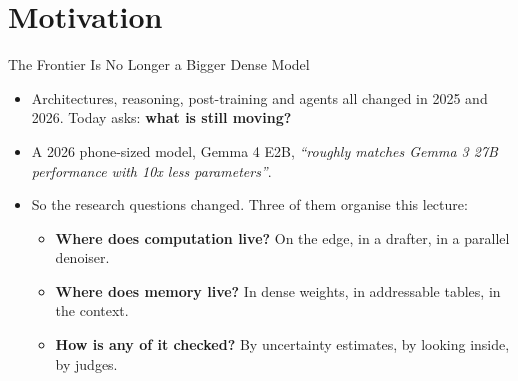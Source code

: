 \section{Motivation}

\begin{frame}{The Frontier Is No Longer a Bigger Dense Model}
    \begin{itemize}\itemsep0.55em
        \item Architectures, reasoning, post-training and agents all changed in 2025 and 2026. Today asks: \textbf{what is still moving?}
        \item A 2026 phone-sized model, Gemma 4 E2B, \emph{``roughly matches Gemma 3 27B performance with 10x less parameters''}.
        \item So the research questions changed. Three of them organise this lecture:
        \begin{itemize}\itemsep0.25em
            \item \textbf{Where does computation live?} On the edge, in a drafter, in a parallel denoiser.
            \item \textbf{Where does memory live?} In dense weights, in addressable tables, in the context.
            \item \textbf{How is any of it checked?} By uncertainty estimates, by looking inside, by judges.
        \end{itemize}
    \end{itemize}
    \vspace{0.3em}
\end{frame}

